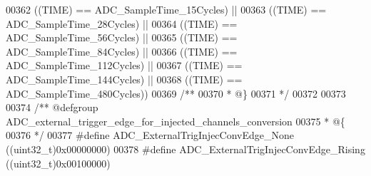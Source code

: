\begin{DoxyCode}
00362                                   \textcolor{preprocessor}{(}\textcolor{preprocessor}{(}\textcolor{preprocessor}{TIME}\textcolor{preprocessor}{)} \textcolor{preprocessor}{==} ADC_SampleTime_15Cycles\textcolor{preprocessor}{)} \textcolor{preprocessor}{||}
00363                                   \textcolor{preprocessor}{(}\textcolor{preprocessor}{(}\textcolor{preprocessor}{TIME}\textcolor{preprocessor}{)} \textcolor{preprocessor}{==} ADC_SampleTime_28Cycles\textcolor{preprocessor}{)} \textcolor{preprocessor}{||}
00364                                   \textcolor{preprocessor}{(}\textcolor{preprocessor}{(}\textcolor{preprocessor}{TIME}\textcolor{preprocessor}{)} \textcolor{preprocessor}{==} ADC_SampleTime_56Cycles\textcolor{preprocessor}{)} \textcolor{preprocessor}{||}
00365                                   \textcolor{preprocessor}{(}\textcolor{preprocessor}{(}\textcolor{preprocessor}{TIME}\textcolor{preprocessor}{)} \textcolor{preprocessor}{==} ADC_SampleTime_84Cycles\textcolor{preprocessor}{)} \textcolor{preprocessor}{||}
00366                                   \textcolor{preprocessor}{(}\textcolor{preprocessor}{(}\textcolor{preprocessor}{TIME}\textcolor{preprocessor}{)} \textcolor{preprocessor}{==} ADC_SampleTime_112Cycles\textcolor{preprocessor}{)} \textcolor{preprocessor}{||}
00367                                   \textcolor{preprocessor}{(}\textcolor{preprocessor}{(}\textcolor{preprocessor}{TIME}\textcolor{preprocessor}{)} \textcolor{preprocessor}{==} ADC_SampleTime_144Cycles\textcolor{preprocessor}{)} \textcolor{preprocessor}{||}
00368                                   \textcolor{preprocessor}{(}\textcolor{preprocessor}{(}\textcolor{preprocessor}{TIME}\textcolor{preprocessor}{)} \textcolor{preprocessor}{==} ADC_SampleTime_480Cycles\textcolor{preprocessor}{)}\textcolor{preprocessor}{)}
00369 \textcolor{comment}{/**}
00370 \textcolor{comment}{  * @\}}
00371 \textcolor{comment}{  */}
00372 
00373 
00374 \textcolor{comment}{/** @defgroup ADC\_external\_trigger\_edge\_for\_injected\_channels\_conversion }
00375 \textcolor{comment}{  * @\{}
00376 \textcolor{comment}{  */}
00377 \textcolor{preprocessor}{#}\textcolor{preprocessor}{define} \textcolor{preprocessor}{ADC\_ExternalTrigInjecConvEdge\_None}          \textcolor{preprocessor}{(}\textcolor{preprocessor}{(}\textcolor{preprocessor}{uint32\_t}\textcolor{preprocessor}{)}0x00000000\textcolor{preprocessor}{)}
00378 \textcolor{preprocessor}{#}\textcolor{preprocessor}{define} \textcolor{preprocessor}{ADC\_ExternalTrigInjecConvEdge\_Rising}        \textcolor{preprocessor}{(}\textcolor{preprocessor}{(}\textcolor{preprocessor}{uint32\_t}\textcolor{preprocessor}{)}0x00100000\textcolor{preprocessor}{)}

\end{DoxyCode}

